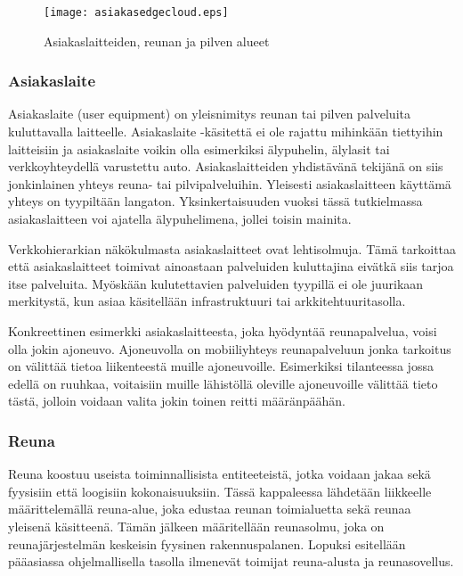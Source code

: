 \begin{figure}[tb]
\texttt{[image: asiakasedgecloud.eps]}
\caption{Asiakaslaitteiden, reunan ja pilven alueet} \label{fig:asiakasedgecloud}
\end{figure}

\subsubsection{Asiakaslaite}
Asiakaslaite (user equipment) on yleisnimitys reunan tai pilven palveluita kuluttavalla laitteelle.
Asiakaslaite -käsitettä ei ole rajattu mihinkään tiettyihin laitteisiin ja asiakaslaite voikin olla esimerkiksi älypuhelin, älylasit tai verkkoyhteydellä varustettu auto. 
Asiakaslaitteiden yhdistävänä tekijänä on siis jonkinlainen yhteys reuna- tai pilvipalveluihin. Yleisesti asiakaslaitteen käyttämä yhteys on tyypiltään langaton. 
Yksinkertaisuuden vuoksi tässä tutkielmassa asiakaslaitteen voi ajatella älypuhelimena, jollei toisin mainita.

Verkkohierarkian näkökulmasta asiakaslaitteet ovat lehtisolmuja. Tämä tarkoittaa että asiakaslaitteet toimivat ainoastaan palveluiden kuluttajina eivätkä siis tarjoa itse palveluita. Myöskään kulutettavien palveluiden tyypillä ei ole juurikaan merkitystä, kun asiaa käsitellään infrastruktuuri tai arkkitehtuuritasolla.

Konkreettinen esimerkki asiakaslaitteesta, joka hyödyntää reunapalvelua, voisi olla jokin ajoneuvo.
Ajoneuvolla on mobiiliyhteys reunapalveluun jonka tarkoitus on välittää tietoa liikenteestä muille ajoneuvoille. Esimerkiksi tilanteessa jossa edellä on ruuhkaa, voitaisiin muille lähistöllä oleville ajoneuvoille välittää tieto tästä, jolloin voidaan valita jokin toinen reitti määränpäähän.



\subsubsection{Reuna} \label{reunatoimijat}
Reuna koostuu useista toiminnallisista entiteeteistä, jotka voidaan jakaa sekä fyysisiin että loogisiin kokonaisuuksiin. 
Tässä kappaleessa lähdetään liikkeelle määrittelemällä reuna-alue, joka edustaa reunan toimialuetta sekä reunaa yleisenä käsitteenä.
Tämän jälkeen määritellään reunasolmu, joka on reunajärjestelmän keskeisin fyysinen rakennuspalanen.
Lopuksi esitellään pääasiassa ohjelmallisella tasolla ilmenevät toimijat reuna-alusta ja reunasovellus.


